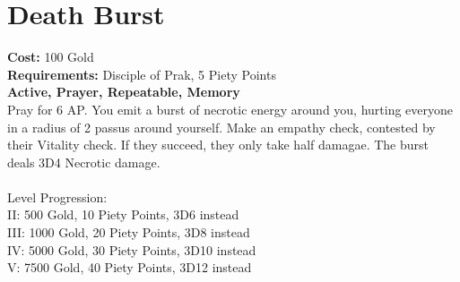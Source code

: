\section{Death Burst}
\textbf{Cost:} 100 Gold\\
\textbf{Requirements:} Disciple of Prak, 5 Piety Points \\
\textbf{Active, Prayer, Repeatable, Memory}\\
Pray for 6 AP. You emit a burst of necrotic energy around you, hurting everyone in a radius of 2 passus around yourself. Make an empathy check, contested by their Vitality check. If they succeed, they only take half damagae. The burst deals 3D4 Necrotic damage.\\
\\
Level Progression:\\
II: 500 Gold, 10 Piety Points, 3D6 instead\\
III: 1000 Gold, 20 Piety Points, 3D8 instead\\
IV: 5000 Gold, 30 Piety Points, 3D10 instead\\
V: 7500 Gold, 40 Piety Points, 3D12 instead\\